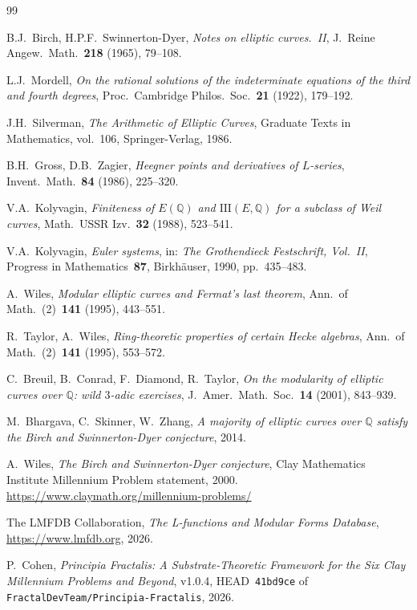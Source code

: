\documentclass[11pt,a4paper]{article}
\theoremstyle{plain}
\theoremstyle{definition}
\theoremstyle{remark}
\newcommand{\Q}{\mathbb{Q}}
\newcommand{\Sha}{\mathrm{III}}
\begin{document}
\begin{thebibliography}{99}

B.J.~Birch, H.P.F.~Swinnerton-Dyer,
\emph{Notes on elliptic curves.~II},
J.~Reine Angew.~Math.~\textbf{218} (1965), 79--108.

L.J.~Mordell,
\emph{On the rational solutions of the indeterminate equations of
the third and fourth degrees},
Proc.~Cambridge Philos.~Soc.~\textbf{21} (1922), 179--192.

J.H.~Silverman,
\emph{The Arithmetic of Elliptic Curves},
Graduate Texts in Mathematics, vol.~106, Springer-Verlag, 1986.

B.H.~Gross, D.B.~Zagier,
\emph{Heegner points and derivatives of $L$-series},
Invent.~Math.~\textbf{84} (1986), 225--320.

V.A.~Kolyvagin,
\emph{Finiteness of $E(\Q)$ and $\Sha(E, \Q)$ for a subclass of
Weil curves},
Math.~USSR Izv.~\textbf{32} (1988), 523--541.

V.A.~Kolyvagin,
\emph{Euler systems},
in: \emph{The Grothendieck Festschrift, Vol.~II},
Progress in Mathematics~\textbf{87}, Birkh\"auser, 1990,
pp.~435--483.

A.~Wiles,
\emph{Modular elliptic curves and Fermat's last theorem},
Ann.~of Math.~(2)~\textbf{141} (1995), 443--551.

R.~Taylor, A.~Wiles,
\emph{Ring-theoretic properties of certain Hecke algebras},
Ann.~of Math.~(2)~\textbf{141} (1995), 553--572.

C.~Breuil, B.~Conrad, F.~Diamond, R.~Taylor,
\emph{On the modularity of elliptic curves over $\Q$: wild $3$-adic
exercises},
J.~Amer.~Math.~Soc.~\textbf{14} (2001), 843--939.

M.~Bhargava, C.~Skinner, W.~Zhang,
\emph{A majority of elliptic curves over $\Q$ satisfy the
Birch and Swinnerton-Dyer conjecture}, 2014.

A.~Wiles,
\emph{The Birch and Swinnerton-Dyer conjecture},
Clay Mathematics Institute Millennium Problem statement, 2000.
\url{https://www.claymath.org/millennium-problems/}

The LMFDB Collaboration,
\emph{The L-functions and Modular Forms Database},
\url{https://www.lmfdb.org}, 2026.

P.~Cohen,
\emph{Principia Fractalis: A Substrate-Theoretic Framework for the
Six Clay Millennium Problems and Beyond},
v1.0.4, HEAD~\texttt{41bd9ce} of
\texttt{FractalDevTeam/Principia-Fractalis}, 2026.

\end{thebibliography}
\end{document}
